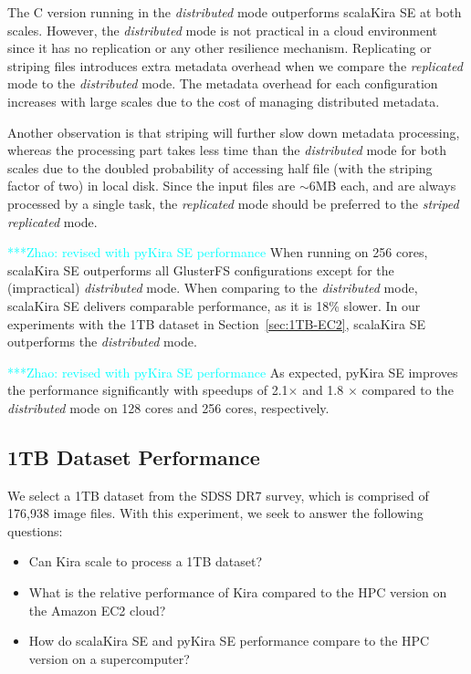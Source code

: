 \documentclass[10pt,journal,compsoc]{IEEEtran}
\newcommand{\zhaonote}[1]{{\textcolor{cyan}    { ***Zhao:      #1 }}}
\newcommand{\zhaonote}[1]{}
\begin{document}
The C version running in the \emph{distributed} mode outperforms scalaKira SE at both scales. 
However, the \emph{distributed} mode is not practical in a cloud environment since
it has no replication or any other resilience mechanism. Replicating or striping
files introduces extra metadata overhead when we compare the \emph{replicated} mode
to the \emph{distributed} mode. The metadata overhead for each configuration increases
with large scales due to the cost of managing distributed metadata.

Another observation is that striping will further slow down metadata processing, whereas the
processing part takes less time than the \emph{distributed} mode for both scales due
to the doubled probability of accessing half file (with the striping factor of two) in local disk.
Since the input files are $\sim$6MB each, and are always processed by a single task, the
\emph{replicated} mode should be preferred to the \emph{striped replicated} mode.

\zhaonote{revised with pyKira SE performance}
When running on 256 cores, scalaKira SE outperforms all GlusterFS configurations except for the (impractical) \emph{distributed}
mode. When comparing to the \emph{distributed} mode, scalaKira SE delivers comparable performance, as it is 18\% slower. 
In our experiments with the 1TB dataset in Section~\ref{sec:1TB-EC2}, 
scalaKira SE outperforms the \emph{distributed} mode.

\zhaonote{revised with pyKira SE performance}
As expected, pyKira SE improves the performance significantly with speedups of 2.1$\times$ and 1.8 $\times$
compared to the \emph{distributed} mode on 128 cores and 256 cores, respectively.

\subsection{1TB Dataset Performance}
\label{sec:Performance-1TB}

We select a 1TB dataset from the SDSS DR7 survey, which is comprised of 176,938 image files. 
With this experiment, we seek to answer the following questions: 

\begin{itemize}
\item Can Kira scale to process a 1TB dataset?
\item What is the relative performance of Kira compared to the HPC version on the Amazon EC2 cloud?
\item How do scalaKira SE and pyKira SE performance compare to the HPC version on a supercomputer?
\end{itemize}
\end{document}
